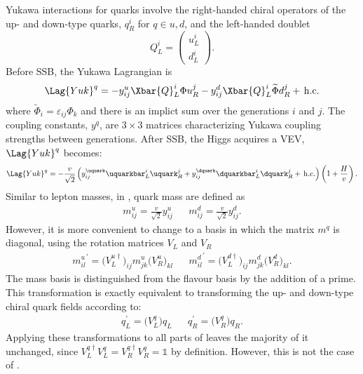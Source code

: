 Yukawa interactions for quarks involve the right-handed chiral operators of the up- and down-type
quarks, $q_R^i$ for $q\in{u,d}$, and the left-handed doublet
\begin{equation}
  Q_L^i = \begin{pmatrix}u^i_L\\d^i_L\end{pmatrix}.
\end{equation}
Before SSB, the Yukawa Lagrangian is
\begin{equation}
  \Lag{Yuk}^q = - y_{ij}^u\Xbar{Q}_L^i\Phi u_R^j
  - y_{ij}^d\Xbar{Q}_L^i\widetilde\Phi d_R^j +\,\mathrm{h.c.}
  \label{eq:th:lagyukq}
\end{equation}
where $\widetilde\Phi_i = \varepsilon_{ij}\Phi_k$ and there is an implict sum over the generations
$i$ and $j$.
The coupling constants, $y^{q}$, are $3\times3$ matrices characterizing Yukawa coupling strengths
between generations.
After SSB, the Higgs acquires a VEV, $\Lag{Yuk}^q$ becomes:
\begin{equation}
  \Lag{Yuk}^q =
  - \frac{v}{\sqrt{2}}
  \left(
  y_{ij}^\uquark\uquarkbar_L^i\uquark_R^j
  + y_{ij}^\dquark\dquarkbar_L^i\dquark_R^j
  +\,\mathrm{h.c.}
  \right)
  \left(1 + \frac{H}{v}\right).
  \label{eq:th:lagyuk2}
\end{equation}
Similar to lepton masses, in , quark mass are defined as
\begin{align}
  m_{ij}^u = \frac{v}{\sqrt{2}}y_{ij}^u &&
  m_{ij}^d = \frac{v}{\sqrt{2}}y_{ij}^d.
\end{align}
However, it is more convenient to change to a basis in which the matrix $m^q$
is diagonal, using the rotation matrices $V_L$ and $V_R$
\begin{align}
  {m_{il}^{u}}^\prime =  \big(V_L^{u\dagger}\big)_{ij} m_{jk}^u\big(V_R^u\big)_{kl} &&
  {m_{il}^{d}}^\prime =  \big(V_L^{d\dagger}\big)_{ij} m_{jk}^d\big(V_R^d\big)_{kl}.
\end{align}
The mass basis is distinguished from the flavour basis by the addition of a prime.
This transformation is exactly equivalent to transforming the up- and
down-type chiral quark fields according to:
\begin{align}
  q_L^\prime = \big(V_L^q\big)q_{L}^{} &&
  q_R^\prime = \big(V_R^q\big)q_{R}^{}.
\end{align}
Applying these transformations to all parts of  leaves the majority of it unchanged, since
$V_{L}^{q\dagger} V_{L}^{q} = V_{R}^{q\dagger} V_{R}^{q} = \mathds{1}$ by definition.
However, this is not the case of .

